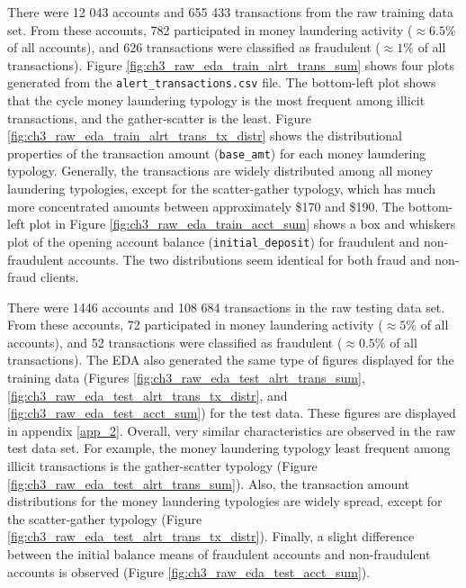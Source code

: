  There were 12 043 accounts and 655 433 transactions from the raw training data set. From these accounts, 782 participated in money laundering activity ($\approx 6.5\%$ of all accounts), and 626 transactions were classified as fraudulent ($\approx 1\%$ of all transactions). Figure \ref{fig:ch3_raw_eda_train_alrt_trans_sum} shows four plots generated from the \texttt{alert\_transactions.csv} file. The bottom-left plot shows that the cycle money laundering typology is the most frequent among illicit transactions, and the gather-scatter is the least. Figure \ref{fig:ch3_raw_eda_train_alrt_trans_tx_distr} shows the distributional properties of the transaction amount (\texttt{base\_amt}) for each money laundering typology. Generally, the transactions are widely distributed among all money laundering typologies, except for the scatter-gather typology, which has much more concentrated amounts between approximately \$170 and \$190. The bottom-left plot in Figure  \ref{fig:ch3_raw_eda_train_acct_sum} shows a box and whiskers plot of the opening account balance (\texttt{initial\_deposit}) for fraudulent and non-fraudulent accounts. The two distributions seem identical for both fraud and non-fraud clients.
 
There were 1446 accounts and 108 684 transactions in the raw testing data set. From these accounts, 72 participated in money laundering activity  ($\approx 5\%$ of all accounts), and 52 transactions were classified as fraudulent ($\approx 0.5\%$ of all transactions). The EDA also generated the same type of figures displayed for the training data (Figures \ref{fig:ch3_raw_eda_test_alrt_trans_sum}, \ref{fig:ch3_raw_eda_test_alrt_trans_tx_distr}, and \ref{fig:ch3_raw_eda_test_acct_sum}) for the test data. These figures are displayed in appendix \ref{app_2}. Overall, very similar characteristics are observed in the raw test data set. For example, the money laundering typology least frequent among illicit transactions is the gather-scatter typology (Figure \ref{fig:ch3_raw_eda_test_alrt_trans_sum}). Also, the transaction amount distributions for the money laundering typologies are widely spread, except for the scatter-gather typology (Figure \ref{fig:ch3_raw_eda_test_alrt_trans_tx_distr}). Finally, a slight difference between the initial balance means of fraudulent accounts and non-fraudulent accounts is observed (Figure \ref{fig:ch3_raw_eda_test_acct_sum}).


